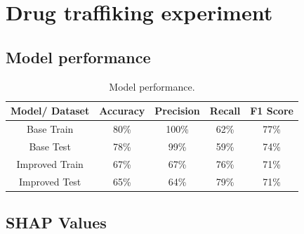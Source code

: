 \documentclass[fleqn,10pt]{wlscirep}
\begin{document}
\appendix
\section{Drug traffiking experiment}

\subsection{Model performance}

\begin{table}[!htb]
\centering
\begin{tabular}{|c|c|c|c|c|}
\hline

\textbf{Model/ Dataset} & \textbf{Accuracy} & \textbf{Precision} & \textbf{Recall} & \textbf{F1 Score} \\ \hline
     Base Train &     80\% &     100\% &   62\% &     77\% \\
      Base Test &     78\% &     99\% &   59\% &     74\% \\
Improved Train &     67\% &      67\% &   76\% &     71\% \\
 Improved Test &     65\% &      64\% &   79\% &     71\% \\

\hline
\end{tabular}
\caption{Model performance.}
\end{table}


\subsection{SHAP Values}
\end{document}
